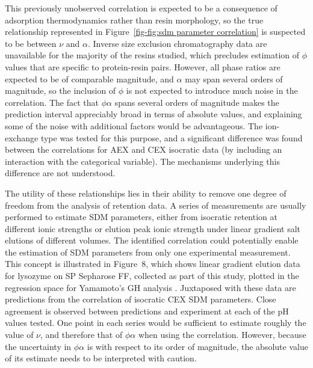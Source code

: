 \documentclass[preprint,review,12pt]{elsarticle}
\begin{document}
        This previously unobserved correlation is expected to be a consequence of adsorption thermodynamics rather than resin morphology, so the true relationship represented in Figure~\ref{fig-fig:sdm parameter correlation} is suspected to be between $\nu$ and $\alpha$. Inverse size exclusion chromatography data are unavailable for the majority of the resins studied, which precludes estimation of $\phi$ values that are specific to protein-resin pairs. However, all phase ratios are expected to be of comparable magnitude, and $\alpha$ may span several orders of magnitude, so the inclusion of $\phi$ is not expected to introduce much noise in the correlation. The fact that $\phi \alpha$ spans several orders of magnitude makes the prediction interval appreciably broad in terms of absolute values, and explaining some of the noise with additional factors would be advantageous. The ion-exchange type was tested for this purpose, and a significant difference was found between the correlations for AEX and CEX isocratic data (by including an interaction with the categorical variable). The mechanisms underlying this difference are not understood.


        The utility of these relationships lies in their ability to remove one degree of freedom from the analysis of retention data. A series of measurements are usually performed to estimate SDM parameters, either from isocratic retention at different ionic strengths or elution peak ionic strength under linear gradient salt elutions of different volumes. The identified correlation could potentially enable the estimation of SDM parameters from only one experimental measurement. This concept is illustrated in Figure~8, which shows linear gradient elution data for lysozyme on SP Sepharose FF, collected as part of this study, plotted in the regression space for Yamamoto's GH analysis \cite{Yamamoto1987}. Juxtaposed with these data are predictions from the correlation of isocratic CEX SDM parameters. Close agreement is observed between predictions and experiment at each of the pH values tested. One point in each series would be sufficient to estimate roughly the value of $\nu$, and therefore that of $\phi \alpha$ when using the correlation. However, because the uncertainty in $\phi \alpha$ is with respect to its order of magnitude, the absolute value of its estimate needs to be interpreted with caution.
\end{document}
